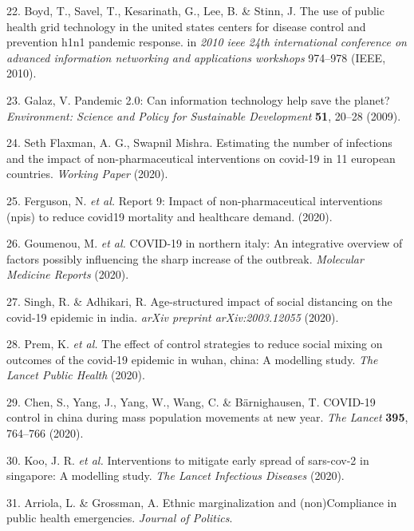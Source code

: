 \documentclass[
]{article}
\newenvironment{cslreferences}%
  {}%
  {\par}
\begin{document}
\begin{cslreferences}
\leavevmode\hypertarget{ref-boyd2010use}{}%
22. Boyd, T., Savel, T., Kesarinath, G., Lee, B. \& Stinn, J. The use of public health grid technology in the united states centers for disease control and prevention h1n1 pandemic response. in \emph{2010 ieee 24th international conference on advanced information networking and applications workshops} 974--978 (IEEE, 2010).

\leavevmode\hypertarget{ref-galaz2009pandemic}{}%
23. Galaz, V. Pandemic 2.0: Can information technology help save the planet? \emph{Environment: Science and Policy for Sustainable Development} \textbf{51}, 20--28 (2009).

\leavevmode\hypertarget{ref-flaxman2020}{}%
24. Seth Flaxman, A. G., Swapnil Mishra. Estimating the number of infections and the impact of non-pharmaceutical interventions on covid-19 in 11 european countries. \emph{Working Paper} (2020).

\leavevmode\hypertarget{ref-ferguson2020report}{}%
25. Ferguson, N. \emph{et al.} Report 9: Impact of non-pharmaceutical interventions (npis) to reduce covid19 mortality and healthcare demand. (2020).

\leavevmode\hypertarget{ref-goumenou2020covid}{}%
26. Goumenou, M. \emph{et al.} COVID-19 in northern italy: An integrative overview of factors possibly influencing the sharp increase of the outbreak. \emph{Molecular Medicine Reports} (2020).

\leavevmode\hypertarget{ref-singh2020age}{}%
27. Singh, R. \& Adhikari, R. Age-structured impact of social distancing on the covid-19 epidemic in india. \emph{arXiv preprint arXiv:2003.12055} (2020).

\leavevmode\hypertarget{ref-prem2020effect}{}%
28. Prem, K. \emph{et al.} The effect of control strategies to reduce social mixing on outcomes of the covid-19 epidemic in wuhan, china: A modelling study. \emph{The Lancet Public Health} (2020).

\leavevmode\hypertarget{ref-chen2020covid}{}%
29. Chen, S., Yang, J., Yang, W., Wang, C. \& Bärnighausen, T. COVID-19 control in china during mass population movements at new year. \emph{The Lancet} \textbf{395}, 764--766 (2020).

\leavevmode\hypertarget{ref-koo2020interventions}{}%
30. Koo, J. R. \emph{et al.} Interventions to mitigate early spread of sars-cov-2 in singapore: A modelling study. \emph{The Lancet Infectious Diseases} (2020).

\leavevmode\hypertarget{ref-arriola2020}{}%
31. Arriola, L. \& Grossman, A. Ethnic marginalization and (non)Compliance in public health emergencies. \emph{Journal of Politics}.


\end{cslreferences}
\end{document}
